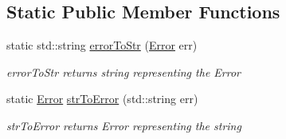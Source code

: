 \subsection*{Static Public Member Functions}
\begin{DoxyCompactItemize}
\item 
\hypertarget{classAsyncPropertyReply_a4875ebce06f1a4b80d4055bfec603838}{static std\+::string \hyperlink{classAsyncPropertyReply_a4875ebce06f1a4b80d4055bfec603838}{error\+To\+Str} (\hyperlink{classAsyncPropertyReply_ad91affaa25fcc3b73947a6cf4591e5d1}{Error} err)}\label{classAsyncPropertyReply_a4875ebce06f1a4b80d4055bfec603838}

\begin{DoxyCompactList}\small\item\em error\+To\+Str returns string representing the Error \end{DoxyCompactList}\item 
\hypertarget{classAsyncPropertyReply_aa87b49be3419ab4ddc10da19d3907b71}{static \hyperlink{classAsyncPropertyReply_ad91affaa25fcc3b73947a6cf4591e5d1}{Error} \hyperlink{classAsyncPropertyReply_aa87b49be3419ab4ddc10da19d3907b71}{str\+To\+Error} (std\+::string err)}\label{classAsyncPropertyReply_aa87b49be3419ab4ddc10da19d3907b71}

\begin{DoxyCompactList}\small\item\em str\+To\+Error returns Error representing the string \end{DoxyCompactList}\end{DoxyCompactItemize}
